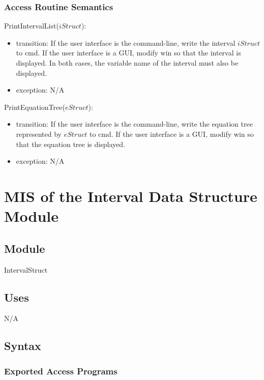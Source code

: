 \documentclass[12pt, titlepage]{article}
\begin{document}
\subsubsection{Access Routine Semantics}

\noindent PrintIntervalList($iStruct$):
\begin{itemize}
	\item transition: If the user interface is the command-line, write the 
	interval $iStruct$ to cmd. If the user interface is a GUI, modify win so 
	that the interval is displayed. In both cases, the variable name of the 
	interval must also be displayed.
	\item exception: N/A
\end{itemize}

\noindent PrintEquationTree($eStruct$):
\begin{itemize}
	\item transition: If the user interface is the command-line, write the 
	equation tree represented by $eStruct$ to cmd. If the user interface is a 
	GUI, modify win so that the equation tree is displayed.
	\item exception: N/A
\end{itemize}

\newpage

\section{MIS of the Interval Data Structure Module} 
\label{Module_intervaldatastructure}

\subsection{Module}

IntervalStruct

\subsection{Uses}

N/A

\subsection{Syntax}

\subsubsection{Exported Access Programs}
\end{document}
